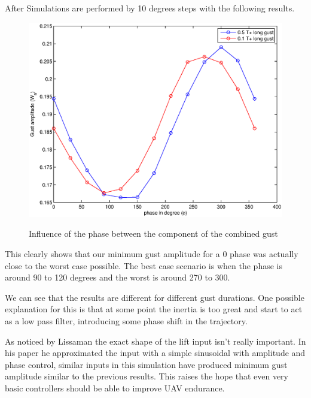     After Simulations are performed by 10 degrees steps with the following results.

    \begin{figure}[ht]
      \begin{center}
	\scalebox{0.8}
	{\includegraphics{./Figures/combined_gust_amplitude_vs_phase.eps}}
      \end{center}
      \caption{Influence of the phase between the component of the combined gust}
      \label{fig:combined_amplitude_phase}
    \end{figure}

    \par This clearly shows that our minimum gust amplitude for a 0 phase was actually close to the worst case possible.
    The best case scenario is when the phase is around 90 to 120 degrees and the worst is around 270 to 300.

    \FloatBarrier

    \par We can see that the results are different for different gust durations.
    One possible explanation for this is that at some point the inertia is too great and start to act as a low pass filter, introducing some phase shift in the trajectory. 




    As noticed by Lissaman the exact shape of the lift input isn't really important.
    In his paper he approximated the input with a simple sinusoidal with amplitude and phase control, similar inputs in this simulation have produced minimum gust amplitude similar to the previous results.
    This raises the hope that even very basic controllers should be able to improve UAV endurance.

